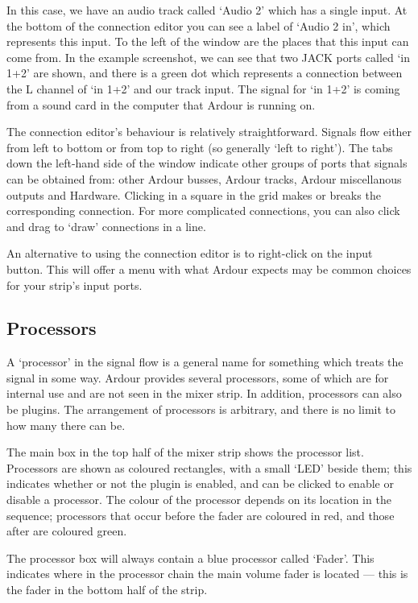 \documentclass[10pt,a4paper]{book}
\begin{document}
In this case, we have an audio track called `Audio 2' which has a
single input.  At the bottom of the connection editor you can see a
label of `Audio 2 in', which represents this input.  To the left of
the window are the places that this input can come from.  In the
example screenshot, we can see that two JACK ports called `in 1+2' are
shown, and there is a green dot which represents a connection between
the L channel of `in 1+2' and our track input.  The signal for `in
1+2' is coming from a sound card in the computer that Ardour is
running on.

The connection editor's behaviour is relatively straightforward.
Signals flow either from left to bottom or from top to right (so
generally `left to right').  The tabs down the left-hand side of the
window indicate other groups of ports that signals can be obtained
from: other Ardour busses, Ardour tracks, Ardour miscellanous outputs
and Hardware.  Clicking in a square in the grid makes or breaks the
corresponding connection.  For more complicated connections, you can
also click and drag to `draw' connections in a line.

An alternative to using the connection editor is to right-click on the
input button.  This will offer a menu with what Ardour expects may be
common choices for your strip's input ports.

\subsection{Processors}

A `processor' in the signal flow is a general name for something which
treats the signal in some way.  Ardour provides several processors,
some of which are for internal use and are not seen in the mixer
strip.  In addition, processors can also be plugins.  The arrangement
of processors is arbitrary, and there is no limit to how many there
can be.

The main box in the top half of the mixer strip shows the processor
list.  Processors are shown as coloured rectangles, with a small `LED'
beside them; this indicates whether or not the plugin is enabled, and
can be clicked to enable or disable a processor.  The colour of the
processor depends on its location in the sequence; processors that
occur before the fader are coloured in red, and those after are
coloured green.

The processor box will always contain a blue processor called `Fader'.
This indicates where in the processor chain the main volume fader is
located --- this is the fader in the bottom half of the strip.
\end{document}
